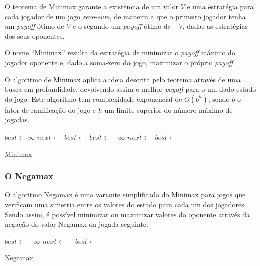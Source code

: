 \documentclass[12pt,a4paper,oneside]{article}
\begin{document}
O teorema de Minimax garante a existência de um valor $V$ e uma estratégia para cada jogador de um jogo \emph{zero-sum}, de maneira a que o primeiro jogador tenha um \emph{payoff} ótimo de $V$ e o segundo um \emph{payoff} ótimo de $-V$, dadas as estratégias dos seus oponentes.

O nome ``Minimax'' resulta da estratégia de minimizar o \emph{payoff} máximo do jogador oponente e, dado a soma-zero do jogo, maximizar o próprio \emph{payoff}.

O algoritmo de Minimax aplica a ideia descrita pelo teorema através de uma busca em profundidade, devolvendo assim o melhor \emph{payoff} para o um dado estado do jogo. Este algoritmo tem complexidade exponencial de $O(b^{h})$, sendo $b$ o fator de ramificação do jogo e $h$ um limite superior do número máximo de jogadas.

\begin{algorithm}
\begin{algorithmic}
 
   
  \EndIf
      \State $best \gets \infty$
          \State $next \gets$ 
          \State $best \gets$ 
      \EndFor
      \State $best \gets -\infty$
          \State $next \gets$ 
          \State $best \gets$ 
      \EndFor
  \EndIf
  \State{} 
\EndFunction
\end{algorithmic}
\caption{Minimax}
\end{algorithm}

\subsubsection{O Negamax}

O algoritmo Negamax é uma variante simplificada do Minimax para jogos que verificam uma simetria entre os valores do estado para cada um dos jogadores. Sendo assim, é possível minimizar ou maximizar valores do oponente através da negação do valor Negamax da jogada seguinte.

\begin{algorithm}
\begin{algorithmic}
 
   
  \EndIf
  \State $best \gets -\infty$
      \State $next \gets -$
      \State $best \gets$ 
  \EndFor
  \State{} 
\EndFunction
\end{algorithmic}
\caption{Negamax}
\end{algorithm}
\end{document}
